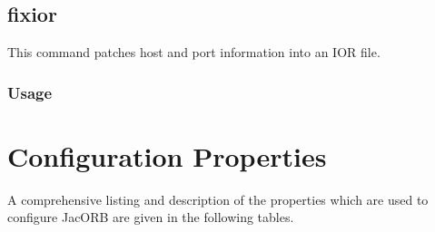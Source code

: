 \documentclass[12pt]{scrbook}
\begin{document}

\section{fixior}

This command patches host and port information into an IOR file.

\subsection*{Usage}


\chapter{Configuration Properties}

A comprehensive listing and description of the properties which are used
to configure JacORB are given in the following tables.
\end{document}
